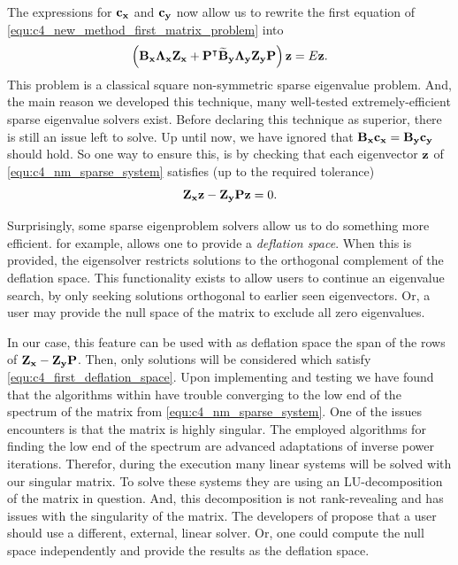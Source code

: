 The expressions for $\vb{c_x}$ and $\vb{c_y}$ now allow us to rewrite the first equation of \eqref{equ:c4_new_method_first_matrix_problem} into
\begin{equation}\label{equ:c4_nm_sparse_system}
    \left(\vb{B_x}\vb{\Lambda_x} \vb{Z_x} + {\vb{P}}^\intercal\vb{\widetilde{B}_y}\vb{\Lambda_y}  \vb{Z_y} \vb{P}\right) \vb{z} = E \vb{z} \text{.}
\end{equation}
This problem is a classical square non-symmetric sparse eigenvalue problem. And, the main reason we developed this technique, many well-tested extremely-efficient sparse eigenvalue solvers exist. Before declaring this technique as superior, there is still an issue left to solve. Up until now, we have ignored that $\vb{B_x} \vb{c_x} = \vb{B_y} \vb{c_y}$ should hold. So one way to ensure this, is by checking that each eigenvector $\vb{z}$ of \eqref{equ:c4_nm_sparse_system} satisfies (up to the required tolerance)
\begin{equation}\label{equ:c4_first_deflation_space}
    \vb{Z_x} \vb{z} -\vb{Z_y} \vb{P} \vb{z} =0 \text{.}
\end{equation}

Surprisingly, some sparse eigenproblem solvers allow us to do something more efficient. \slepc \cite{hernandez_slepc_2005} for example, allows one to provide a \emph{deflation space}. When this is provided, the eigensolver restricts solutions to the orthogonal complement of the deflation space. This functionality exists to allow users to continue an eigenvalue search, by only seeking solutions orthogonal to earlier seen eigenvectors. Or, a user may provide the null space of the matrix to exclude all zero eigenvalues.

In our case, this feature can be used with as deflation space the span of the rows of $\vb{Z_x} - \vb{Z_y} \vb{P}$. Then, only solutions will be considered which satisfy \eqref{equ:c4_first_deflation_space}. Upon implementing and testing we have found that the algorithms within \slepc have trouble converging to the low end of the spectrum of the matrix from \eqref{equ:c4_nm_sparse_system}. One of  the issues \slepc encounters is that the matrix is highly singular. The employed algorithms for finding the low end of the spectrum are advanced adaptations of inverse power iterations. Therefor, during the execution many linear systems will be solved with our singular matrix. To solve these systems they are using an LU-decomposition of the matrix in question. And, this decomposition is not rank-revealing and has issues with the singularity of the matrix. The developers of \slepc propose that a user should use a different, external, linear solver. Or, one could compute the null space independently and provide the results as the deflation space.

